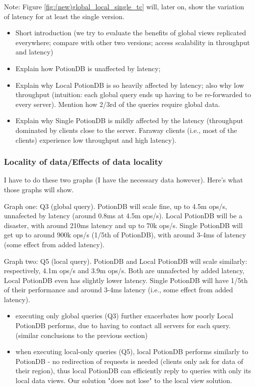 \documentclass[sigplan,10pt]{acmart}
\begin{document}
Note: Figure \ref{fig:(new)global_local_single_tc} will, later on, show the variation of latency for at least the single version.
\begin{itemize}
	\item Short introduction (we try to evaluate the benefits of global views replicated everywhere; compare with other two versions; access scalability in throughput and latency)
	\item Explain how PotionDB is unaffected by latency;
	\item Explain why Local PotionDB is so heavily affected by latency; also why low throughput (intuition: each global query ends up having to be re-forwarded to every server). Mention how 2/3rd of the queries require global data.
	\item Explain why Single PotionDB is mildly affected by the latency (throughput dominated by clients close to the server. Faraway clients (i.e., most of the clients) experience low throughput and high latency).
\end{itemize}

\subsubsection{Locality of data/Effects of data locality}

I have to do these two graphs (I have the necessary data however).
Here's what those graphs will show.

Graph one: Q3 (global query). PotionDB will scale fine, up to 4.5m ops/s, unnafected by latency (around 0.8ms at 4.5m ops/s). Local PotionDB will be a disaster, with around 210ms latency and up to 70k ops/s. Single PotionDB will get up to around 900k ops/s (1/5th of PotionDB), with around 3-4ms of latency (some effect from added latency).

Graph two: Q5 (local query). PotionDB and Local PotionDB will scale similarly: respectively, 4.1m ops/s and 3.9m ops/s. Both are unnafected by added latency, Local PotionDB even has slightly lower latency. Single PotionDB will have 1/5th of their performance and around 3-4ms latency (i.e., some effect from added latency).

\begin{itemize}
	\item executing only global queries (Q3) further exacerbates how poorly Local PotionDB performs, due to having to contact all servers for each query. (similar conclusions to the previous section)
	\item when executing local-only queries (Q5), local PotionDB performs similarly to PotionDB - no redirection of requests is needed (clients only ask for data of their region), thus local PotionDB can efficiently reply to queries with only its local data views. Our solution "does not lose" to the local view solution.
\end{itemize}
\end{document}
